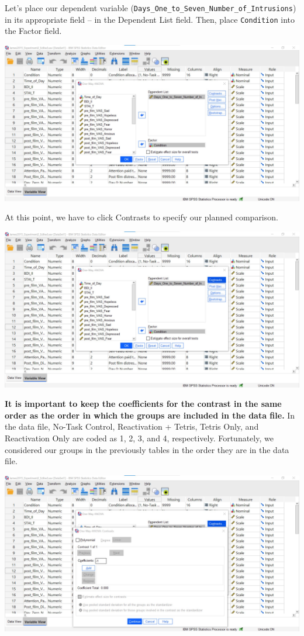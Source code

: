 \documentclass[
]{book}
\begin{document}
Let's place our dependent variable (\texttt{Days\_One\_to\_Seven\_Number\_of\_Intrusions}) in its appropriate field -- in the Dependent List field. Then, place \texttt{Condition} into the Factor field.

\includegraphics{img/8.6.4.23.png}

At this point, we have to click {Contrasts} to specify our planned comparison.

\includegraphics{img/8.6.4.24.png}

\textbf{It is important to keep the coefficients for the contrast in the same order as the order in which the groups are included in the data file.} In the data file, No-Task Control, Reactivation + Tetris, Tetris Only, and Reactivation Only are coded as 1, 2, 3, and 4, respectively. Fortunately, we considered our groups in the previously tables in the order they are in the data file.

\includegraphics{img/8.6.4.25.png}
\end{document}
